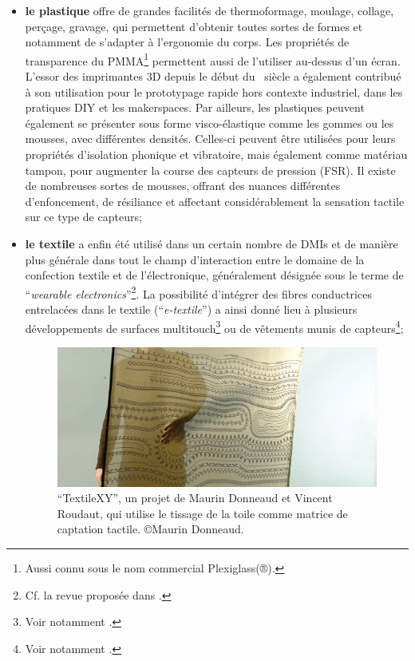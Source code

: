 \begin{itemize}[noitemsep]
	\item \textbf{le plastique} offre de grandes facilités de thermoformage, moulage, collage, perçage, gravage, qui permettent d'obtenir toutes sortes de formes et notamment de s'adapter à l'ergonomie du corps. Les propriétés de transparence du \gls{PMMA}\footnote{Aussi connu sous le nom commercial Plexiglass(®).} permettent aussi de l'utiliser au-dessus d'un écran. L'essor des imprimantes 3D depuis le début du ~siècle a également contribué à son utilisation pour le prototypage rapide hors contexte industriel, dans les pratiques \gls{DIY} et les \glspl{makerspace}. Par ailleurs, les plastiques peuvent également se présenter sous forme visco-élastique comme les gommes ou les mousses, avec différentes densités. Celles-ci peuvent être utilisées pour leurs propriétés d'isolation phonique et vibratoire, mais également comme matériau tampon, pour augmenter la course des capteurs de pression (\gls{FSR}). Il existe de nombreuses sortes de mousses, offrant des nuances différentes d'enfoncement, de résiliance et affectant considérablement la sensation tactile sur ce type de capteurs;

	\item \textbf{le textile} a enfin été utilisé dans un certain nombre de \glspl{DMI} et de manière plus générale dans tout le champ d'interaction entre le domaine de la confection textile et de l'électronique, généralement désignée sous le terme de ``\textit{wearable electronics}''\footnote{Cf. la revue proposée dans \cite{stoppa_wearable_2014}.}. La possibilité d'intégrer des fibres conductrices entrelacées dans le textile (``\textit{e-textile}'') a ainsi donné lieu à plusieurs développements de surfaces multitouch\footnote{Voir notamment \cite{freed_application_2008, donneaud_designing_2017, wicaksono_fabrickeyboard:_2017}.} ou de vêtements munis de capteurs\footnote{Voir notamment \cite{hayafuchi_musicglove_2008, serafin_controlling_2014, myllykoski_prototyping_2015}.};
	\begin{figure}[!htbp]
		\captionsetup{format=plain}%
		\includegraphics[width=\textwidth]{gfx/05_interfaces/XYinteraction.jpg}
		\caption[Textile interactif]{``TextileXY'', un projet de Maurin Donneaud et Vincent Roudaut, qui utilise le tissage de la toile comme matrice de captation tactile. ©Maurin Donneaud.}
	\label{fig:interface:XYinteraction}
	\end{figure}


\end{itemize}
